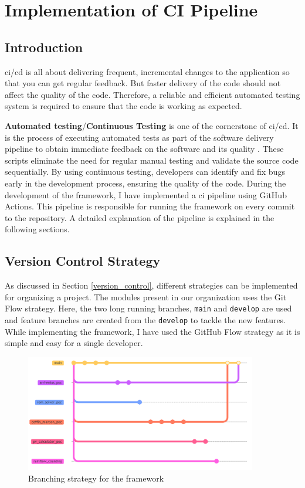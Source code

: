 \chapter{Implementation of CI Pipeline} \label{ci_pipeline}
\section{Introduction}
\acrshort{ci}/\acrshort{cd} is all about delivering frequent, incremental changes to the application so that you can get regular feedback. But faster delivery
of the code should not affect the quality of the code. Therefore, a reliable and efficient automated testing system is required to ensure that the code is 
working as expected.

\textbf{Automated testing}/\textbf{Continuous Testing} is one of the cornerstone of \acrshort{ci}/\acrshort{cd}. It is the process of executing automated tests as part of the 
software delivery pipeline to obtain immediate feedback on the software and its quality \cite{10434454}. These scripts eliminate the need for regular manual
testing and validate the source code sequentially. By using continuous testing, developers can identify and fix bugs early in the development process, ensuring
the quality of the code. During the development of the framework, I have implemented a \acrshort{ci} pipeline using GitHub Actions. This pipeline is responsible 
for running the framework on every commit to the repository. A detailed explanation of the pipeline is explained in the following sections.

\section{Version Control Strategy}
As discussed in Section \ref{version_control}, different strategies can be implemented for organizing a project. The modules present in our organization uses the 
Git Flow strategy. Here, the two long running branches, \texttt{main} and \texttt{develop} are used and feature branches are created from the \texttt{develop}
to tackle the new features. While implementing the framework, I have used the GitHub Flow strategy as it is simple and easy for a single developer. 
\newpage
\begin{figure}[!ht]
    \centering
    \includegraphics[width=0.9\textwidth]{Images/thesis_branching_strategy.png}
    \caption{Branching strategy for the framework}
    \label{branching_strategy}
\end{figure}

